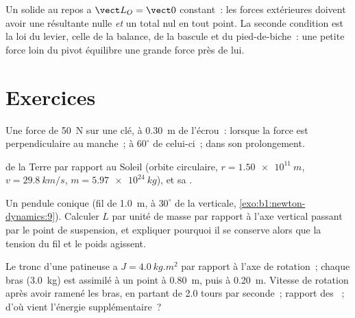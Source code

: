 \begin{remark}[Statique]\label{rem:b1:angular-momentum:statics}
Un solide au repos a $\vect L_O = \vect 0$ constant~: les forces
extérieures doivent avoir une résultante nulle \emph{et} un  total
nul en tout point. La seconde condition est la loi du levier, celle de
la balance, de la bascule et du pied-de-biche~: une petite force loin du
pivot équilibre une grande force près de lui.
\end{remark}

\section{Exercices}

\begin{exercise}[$\star$]\label{exo:b1:angular-momentum:1}
Une force de \qty{50}{N} sur une clé, à \qty{0.30}{m} de l'écrou~:
 lorsque la force est perpendiculaire au manche~; à $60^\circ$ de
celui-ci~; dans son prolongement.
\end{exercise}

\begin{exercise}[$\star$]\label{exo:b1:angular-momentum:2}
 de la Terre par rapport au Soleil (orbite circulaire,
$r = \qty{1.50e11}{m}$, $v = \qty{29.8}{km/s}$, $m = \qty{5.97e24}{kg}$),
et sa .
\end{exercise}

\begin{exercise}[$\star$]\label{exo:b1:angular-momentum:3}
Un pendule conique (fil de \qty{1.0}{m}, à $30^\circ$ de la verticale,
\cref{exo:b1:newton-dynamics:9}). Calculer $L$ par unité de masse par
rapport à l'axe vertical passant par le point de suspension, et
expliquer pourquoi il se conserve alors que la tension du fil et le
poids agissent.
\end{exercise}

\begin{exercise}[$\star$]\label{exo:b1:angular-momentum:4}
Le tronc d'une patineuse a $J = \qty{4.0}{kg.m^2}$ par rapport à l'axe de
rotation~; chaque bras (\qty{3.0}{kg}) est assimilé à un point à
\qty{0.80}{m}, puis à \qty{0.20}{m}. Vitesse de rotation après avoir
ramené les bras, en partant de \qty{2.0}{} tours par seconde~; rapport
des ~; d'où vient l'énergie supplémentaire~?
\end{exercise}

